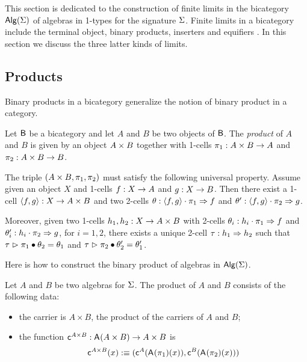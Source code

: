 This section is dedicated to the construction of finite limits in the
bicategory $\mathsf{Alg}(\Sigma)$ of algebras in 1-types for the signature
$\Sigma$.  Finite limits in a bicategory include the terminal object,
binary products, inserters and equifiers
\cite{power1991characterization}. In this section we discuss the three
latter kinds of limits.

\subsection{Products}

Binary products in a bicategory generalize the notion of binary
product in a category.

\begin{definition}
Let $\mathsf{B}$ be a bicategory and let $A$ and $B$ be two objects of
$\mathsf{B}$. The \emph{product} of $A$ and $B$ is given by an object $A \times B$ together with 1-cells $\pi_1 : A \times B \rightarrow A$ and
$\pi_2 : A \times B \rightarrow B$.

The triple $(A \times B,\pi_1, \pi_2)$ must satisfy the following
universal property. Assume given an object $X$ and 1-cells $f : X
\rightarrow A$ and $g : X \rightarrow B$. Then there exist a 1-cell
$\langle f , g \rangle : X \rightarrow A \times B$ and two 2-cells $\theta :
\langle f , g \rangle \cdot \pi_1 \Rightarrow f$ and $\theta' : \langle f , g \rangle
\cdot \pi_2 \Rightarrow g$.

Moreover, given two 1-cells $h_1,h_2 : X \rightarrow A \times B$ with
2-cells $\theta_i : h_i \cdot \pi_1 \Rightarrow f$ and $\theta'_i : h_i
\cdot \pi_2 \Rightarrow g$, for $i= 1,2$, there exists a unique
2-cell $\tau : h_1 \Rightarrow h_2$ such that $\tau \vartriangleright
\pi_1 \bullet \theta_2 = \theta_1$ and $\tau \vartriangleright \pi_2 \bullet
\theta'_2 = \theta'_1$.
\end{definition} 

Here is how to construct the binary product of algebras in
$\mathsf{Alg}(\Sigma)$.

\begin{definition}
Let $A$ and $B$ be two algebras for $\Sigma$. The product of $A$ and
$B$ consists of the following data:
\begin{itemize}
\item the carrier is $A \times B$, the product of the carriers of $A$ and $B$;
\item the function $\mathsf{c}^{A \times B} : \mathsf{A}^{}(A \times B) \rightarrow A \times B$ is
\[
\mathsf{c}^{A \times B}(x) :\equiv (\mathsf{c}^{A}(\mathsf{A}^{}(\pi_1)(x)),\mathsf{c}^{B}(\mathsf{A}^{}(\pi_2)(x)))
\]
\end{itemize}
\end{definition}

